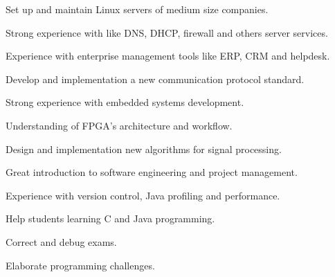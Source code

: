 \documentclass[]{deedy-resume-openfont}
\begin{document}
\begin{minipage}[t]{0.66\textwidth}
\begin{tightemize}
\item Set up and maintain Linux servers of medium size companies.
\item Strong experience with like DNS, DHCP, firewall and others server services.
\item Experience with enterprise management tools like ERP, CRM and helpdesk.
\end{tightemize}
\sectionsep

\begin{tightemize}
\item Develop and implementation a new communication protocol standard.
\item Strong experience with embedded systems development.
\item Understanding of FPGA's architecture and workflow.
\end{tightemize}
\sectionsep

\begin{tightemize}
\item Design and implementation new algorithms for signal processing.
\item Great introduction to software engineering and project management.
\item Experience with version control, Java profiling and performance.
\end{tightemize}
\sectionsep

\begin{tightemize}
\item Help students learning C and Java programming.
\item Correct and debug exams.
\item Elaborate programming challenges.
\end{tightemize}
\sectionsep
\end{minipage} 
\end{document}
